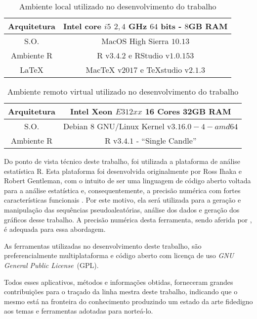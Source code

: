\begin{table}[hbt]
\centering
\caption{Ambiente local utilizado no desenvolvimento do trabalho}\label{local_env}
\begin{tabular}{c|c}
	\toprule
	Arquitetura & Intel core $i5$ $2,4$ GHz $64$ bits - $8$GB RAM\\
	\midrule
	S.O. & MacOS High Sierra $10.13$ \\
	\midrule
	Ambiente R & R v$3.4.2$ e RStudio v$1.0.153$\\
	\midrule
	\LaTeX & MacTeX v$2017$ e TeXstudio v$2.1.3$\\
	\bottomrule
\end{tabular}
\end{table}


\begin{table}[hbt]
\centering
\caption{Ambiente remoto virtual utilizado no desenvolvimento do trabalho}\label{virt_env}
\begin{tabular}{c|c}
	\toprule
	Arquitetura & Intel Xeon $E312xx$ 16 Cores 32GB RAM\\
	\midrule
	S.O. & Debian 8 GNU/Linux Kernel v$3.16.0-4-amd64$\\
	\midrule
	Ambiente R & R v$3.4.1$ - ``Single Candle''\\
	\bottomrule
\end{tabular}
\end{table}


Do ponto de vista técnico deste trabalho, foi utilizada a plataforma de análise estatística R. 
Esta plataforma foi desenvolvida originalmente por Ross Ihaka e Robert Gentleman, com o intuito de ser uma linguagem de código aberto voltada para a análise estatística e, consequentemente, a precisão numérica com fortes características funcionais \citep{Rmanual}. 
Por este motivo, ela será utilizada para a geração e manipulação das sequências pseudoaleatórias, análise dos dados e geração dos gráficos desse trabalho. A precisão numérica desta ferramenta, sendo aferida por \citet{Almiron:09}, é adequada para essa abordagem.

As ferramentas utilizadas no desenvolvimento deste trabalho, são preferencialmente multiplataforma e código aberto com licença de uso \emph{GNU General Public License}~(GPL).

Todos esses aplicativos, métodos e informações obtidas, forneceram grandes contribuições para o traçado da linha mestra deste trabalho, indicando que o mesmo está na fronteira do conhecimento produzindo um estado da arte fidedigno aos temas e ferramentas adotadas para norteá-lo.

